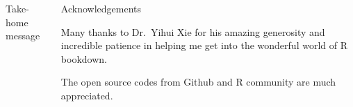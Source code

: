 \documentclass[english,xcolor=table,t
]{beamer}
\begin{document}
\begin{frame}
\begin{columns}
\begin{block}{Take-home message}
\end{block}

\begin{block}{Acknowledgements}

Many thanks to Dr.~Yihui Xie for his amazing generosity and incredible
patience in helping me get into the wonderful world of R bookdown.

The open source codes from Github and R community are much appreciated.

\vskip1.5cm

\end{block}

\end{columns}

\end{frame}
\end{document}

